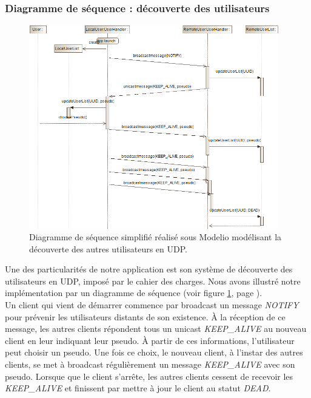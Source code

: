 \documentclass[12pt, a4paper]{article}
\begin{document}
    \subsubsection{Diagramme de séquence : découverte des utilisateurs}
    
    \begin{figure}[!htp]
        \centering
        \includegraphics[width=0.97\textwidth]{img/sequence.png}
        \caption{Diagramme de séquence simplifié réalisé sous Modelio modélisant la découverte des autres utilisateurs en UDP.}
        \label{sequence}
    \end{figure}
    
    Une des particularités de notre application est son système de découverte des utilisateurs en UDP, imposé par le cahier des charges. Nous avons illustré notre implémentation par un diagramme de séquence (voir figure \ref{sequence}, page \pageref{sequence}).\\
    
    Un client qui vient de démarrer commence par broadcast un message \textit{NOTIFY} pour prévenir les utilisateurs distants de son existence. À la réception de ce message, les autres clients répondent tous un unicast \textit{KEEP\_ALIVE} au nouveau client en leur indiquant leur pseudo. À partir de ces informations, l'utilisateur peut choisir un pseudo. Une fois ce choix, le nouveau client, à l'instar des autres clients, se met à broadcast régulièrement un message \textit{KEEP\_ALIVE} avec son pseudo. Lorsque que le client s'arrête, les autres clients cessent de recevoir les \textit{KEEP\_ALIVE} et finissent par mettre à jour le client au statut \textit{DEAD}. 
    
\end{document}
